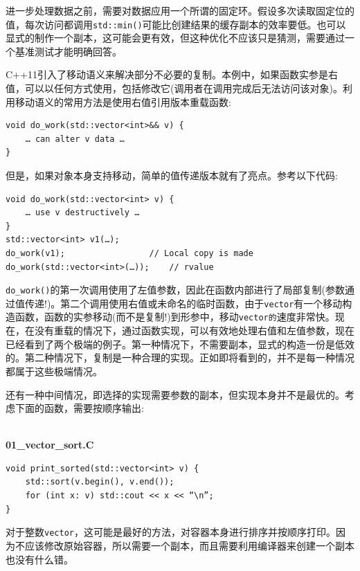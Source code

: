 进一步处理数据之前，需要对数据应用一个所谓的固定环。假设多次读取固定位的值，每次访问都调用\texttt{std::min()}可能比创建结果的缓存副本的效率要低。也可以显式的制作一个副本，这可能会更有效，但这种优化不应该只是猜测，需要通过一个基准测试才能明确回答。

C++11引入了移动语义来解决部分不必要的复制。本例中，如果函数实参是右值，可以以任何方式使用，包括修改它(调用者在调用完成后无法访问该对象)。利用移动语义的常用方法是使用右值引用版本重载函数:

\begin{lstlisting}[style=styleCXX]
void do_work(std::vector<int>&& v) {
	… can alter v data … 
}
\end{lstlisting}

但是，如果对象本身支持移动，简单的值传递版本就有了亮点。参考以下代码:

\begin{lstlisting}[style=styleCXX]
void do_work(std::vector<int> v) {
	… use v destructively … 
}
std::vector<int> v1(…);
do_work(v1);                 // Local copy is made
do_work(std::vector<int>(…));    // rvalue
\end{lstlisting}

\texttt{do\_work()}的第一次调用使用了左值参数，因此在函数内部进行了局部复制(参数通过值传递!)。第二个调用使用右值或未命名的临时函数，由于\texttt{vector}有一个移动构造函数，函数的实参移动(而不是复制!)到形参中，移动\texttt{vector的}速度非常快。现在，在没有重载的情况下，通过函数实现，可以有效地处理右值和左值参数，现在已经看到了两个极端的例子。第一种情况下，不需要副本，显式的构造一份是低效的。第二种情况下，复制是一种合理的实现。正如即将看到的，并不是每一种情况都属于这些极端情况。


还有一种中间情况，即选择的实现需要参数的副本，但实现本身并不是最优的。考虑下面的函数，需要按顺序输出:

\hspace*{\fill} \\ %
\noindent
\textbf{01\_vector\_sort.C}
\begin{lstlisting}[style=styleCXX]
void print_sorted(std::vector<int> v) {
	std::sort(v.begin(), v.end());
	for (int x: v) std::cout << x << “\n”;
}
\end{lstlisting}

对于整数\texttt{vector}，这可能是最好的方法，对容器本身进行排序并按顺序打印。因为不应该修改原始容器，所以需要一个副本，而且需要利用编译器来创建一个副本也没有什么错。

